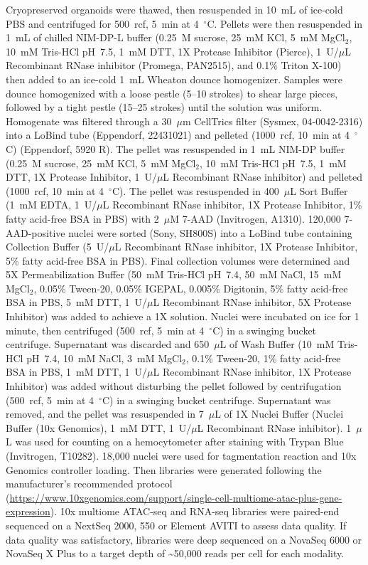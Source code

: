 Cryopreserved organoids were thawed, then resuspended in 10~mL of ice-cold PBS and centrifuged for 500~rcf, 5~min at 4~\ensuremath{^{\circ}}C. Pellets were then resuspended in 1~mL of chilled NIM-DP-L buffer (0.25~M sucrose, 25~mM KCl, 5~mM MgCl$_2$, 10~mM Tris-HCl pH~7.5, 1~mM DTT, 1X Protease Inhibitor (Pierce), 1~U/\ensuremath{\mu}L Recombinant RNase inhibitor (Promega, PAN2515), and 0.1\% Triton X-100) then added to an ice-cold 1~mL Wheaton dounce homogenizer. Samples were dounce homogenized with a loose pestle (5--10 strokes) to shear large pieces, followed by a tight pestle (15--25 strokes) until the solution was uniform. Homogenate was filtered through a 30~\ensuremath{\mu}m CellTrics filter (Sysmex, 04-0042-2316) into a LoBind tube (Eppendorf, 22431021) and pelleted (1000~rcf, 10~min at 4~\ensuremath{^{\circ}}C) (Eppendorf, 5920 R). The pellet was resuspended in 1~mL NIM-DP buffer (0.25~M sucrose, 25~mM KCl, 5~mM MgCl$_2$, 10~mM Tris-HCl pH~7.5, 1~mM DTT, 1X Protease Inhibitor, 1~U/\ensuremath{\mu}L Recombinant RNase inhibitor) and pelleted (1000~rcf, 10~min at 4~\ensuremath{^{\circ}}C). The pellet was resuspended in 400~\ensuremath{\mu}L Sort Buffer (1~mM EDTA, 1~U/\ensuremath{\mu}L Recombinant RNase inhibitor, 1X Protease Inhibitor, 1\% fatty acid-free BSA in PBS) with 2~\ensuremath{\mu}M 7-AAD (Invitrogen, A1310). 120{,}000 7-AAD-positive nuclei were sorted (Sony, SH800S) into a LoBind tube containing Collection Buffer (5~U/\ensuremath{\mu}L Recombinant RNase inhibitor, 1X Protease Inhibitor, 5\% fatty acid-free BSA in PBS). Final collection volumes were determined and 5X Permeabilization Buffer (50~mM Tris-HCl pH~7.4, 50~mM NaCl, 15~mM MgCl$_2$, 0.05\% Tween-20, 0.05\% IGEPAL, 0.005\% Digitonin, 5\% fatty acid-free BSA in PBS, 5~mM DTT, 1~U/\ensuremath{\mu}L Recombinant RNase inhibitor, 5X Protease Inhibitor) was added to achieve a 1X solution. Nuclei were incubated on ice for 1 minute, then centrifuged (500~rcf, 5~min at 4~\ensuremath{^{\circ}}C) in a swinging bucket centrifuge. Supernatant was discarded and 650~\ensuremath{\mu}L of Wash Buffer (10~mM Tris-HCl pH~7.4, 10~mM NaCl, 3~mM MgCl$_2$, 0.1\% Tween-20, 1\% fatty acid-free BSA in PBS, 1~mM DTT, 1~U/\ensuremath{\mu}L Recombinant RNase inhibitor, 1X Protease Inhibitor) was added without disturbing the pellet followed by centrifugation (500~rcf, 5~min at 4~\ensuremath{^{\circ}}C) in a swinging bucket centrifuge. Supernatant was removed, and the pellet was resuspended in 7~\ensuremath{\mu}L of 1X Nuclei Buffer (Nuclei Buffer (10x Genomics), 1~mM DTT, 1~U/\ensuremath{\mu}L Recombinant RNase inhibitor). 1~\ensuremath{\mu}L was used for counting on a hemocytometer after staining with Trypan Blue (Invitrogen, T10282). 18{,}000 nuclei were used for tagmentation reaction and 10x Genomics controller loading. Then libraries were generated following the manufacturer’s recommended protocol (\url{https://www.10xgenomics.com/support/single-cell-multiome-atac-plus-gene-expression}). 10x multiome ATAC-seq and RNA-seq libraries were paired-end sequenced on a NextSeq 2000, 550 or Element AVITI to assess data quality. If data quality was satisfactory, libraries were deep sequenced on a NovaSeq 6000 or NovaSeq X Plus to a target depth of \textasciitilde50{,}000 reads per cell for each modality.

